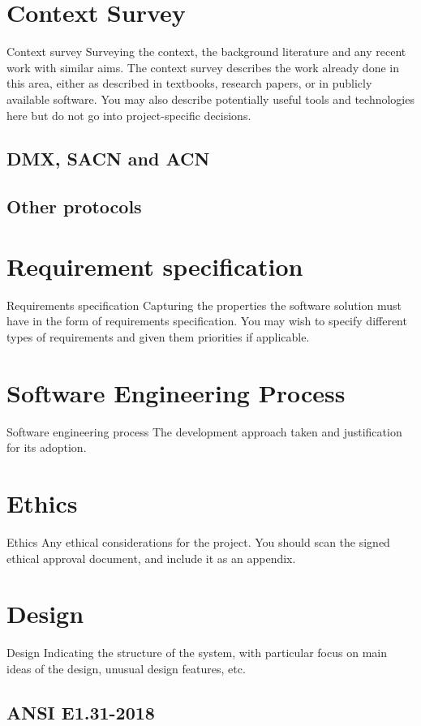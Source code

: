 \documentclass[11pt,a4paper,notitlepage]{report}
\begin{document}
	\section*{Context Survey}
	Context survey
	Surveying the context, the background literature and
	any recent work with similar aims. The context survey
	describes the work already done in this area, either as
	described in textbooks, research papers, or in publicly
	available software. You may also describe potentially
	useful tools and technologies here but do not go into
	project-specific decisions.
	\subsection*{DMX, SACN and ACN}
	\subsection*{Other protocols}
	
	\section*{Requirement specification}
	Requirements
	specification
	Capturing the properties the software solution must
	have in the form of requirements specification. You
	may wish to specify different types of requirements and
	given them priorities if applicable.
	
	\section*{Software Engineering Process}
		Software
	engineering
	process
	The development approach taken and justification for
	its adoption.
	
	\section*{Ethics}
	Ethics
	Any ethical considerations for the project. You should
	scan the signed ethical approval document, and include
	it as an appendix.
	
	\section*{Design}
	Design
	Indicating the structure of the system, with particular
	focus on main ideas of the design, unusual design
	features, etc.
	\subsection*{ANSI E1.31-2018}
\end{document}
